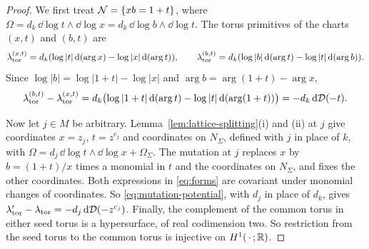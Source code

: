 \documentclass[12pt, letter]{amsart}
\theoremstyle{definition}
\begin{document}
\begin{proof}
We first treat $\mathcal{N} = \{xb=1+t\}$, where $\Omega=d_k\,\dd\log t\wedge \dd\log x=d_k\,\dd\log b\wedge \dd\log t$.
The torus primitives of the charts $(x,t)$ and $(b,t)$ are
\[
 \lambda_{\mathrm{tor}}^{(x,t)}=d_k(\log|t|\,\mathrm{d}(\arg x)-\log|x|\,\mathrm{d}(\arg t)),\qquad
 \lambda_{\mathrm{tor}}^{(b,t)}=d_k(\log|b|\, \mathrm{d} (\arg t)-\log|t|\,\mathrm{d}(\arg b)).
\]
Since $\log|b|=\log|1+t|-\log|x|$ and $\arg b=\arg(1+t)-\arg x$,
\begin{equation}\label{eq:mutation-potential}
 \lambda_{\mathrm{tor}}^{(b,t)}-\lambda_{\mathrm{tor}}^{(x,t)}
 =d_k\bigl(\log|1+t|\,\mathrm{d}(\arg t)-\log|t|\,\mathrm{d}(\arg(1+t))\bigr)
 =-d_k\,\mathrm{d}\mathcal D(-t).
\end{equation}

Now let $j\in M$ be arbitrary.
Lemma~\ref{lem:lattice-splitting}(i) and (ii) at $j$ give coordinates $x=z_j$, $t=z^{c_j}$ and coordinates on $N_\Sigma$, defined with $j$ in place of $k$, with $\Omega=d_j\,\dd\log t\wedge \dd\log x+\Omega_\Sigma$.
The mutation at $j$ replaces $x$ by $b=(1+t)/x$ times a monomial in $t$ and the coordinates on $N_\Sigma$, and fixes the other coordinates.
Both expressions in \eqref{eq:forms} are covariant under monomial changes of coordinates.
So \eqref{eq:mutation-potential}, with $d_j$ in place of $d_k$, gives $\lambda_{\mathrm{tor}}'-\lambda_{\mathrm{tor}}=-d_j\,\mathrm{d}\mathcal D(-z^{c_j})$.
Finally, the complement of the common torus in either seed torus is a hypersurface, of real codimension two.
So restriction from the seed torus to the common torus is injective on $H^1(\,\cdot\,;\mathbb{R})$.
\end{proof}
\end{document}
